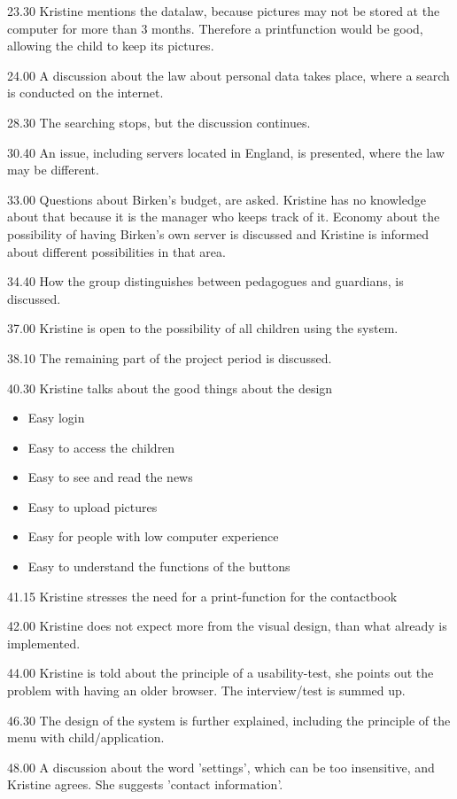 23.30
Kristine mentions the datalaw, because pictures may not be stored at the computer for more than 3 months. Therefore a printfunction would be good, allowing the child to keep its pictures.

24.00
A discussion about the law about personal data takes place, where a search is conducted on the internet.

28.30
The searching stops, but the discussion continues.

30.40
An issue, including servers located in England, is presented, where the law may be different.

33.00
Questions about Birken's budget, are asked. Kristine has no knowledge about that because it is the manager who keeps track of it. Economy about the possibility of having Birken's own server is discussed and Kristine is informed about different possibilities in that area.

34.40
How the group distinguishes between pedagogues and guardians, is discussed.

37.00
Kristine is open to the possibility of all children using the system.

38.10
The remaining part of the project period is discussed.

40.30
Kristine talks about the good things about the design
\begin{itemize}
\item{Easy login}
\item{Easy to access the children}
\item{Easy to see and read the news}
\item{Easy to upload pictures}
\item{Easy for people with low computer experience}
\item{Easy to understand the functions of the buttons}
\end{itemize}

41.15
Kristine stresses the need for a print-function for the contactbook

42.00
Kristine does not expect more from the visual design, than what already is implemented.

44.00
Kristine is told about the principle of a usability-test, she points out the problem with having an older browser.
The interview/test is summed up.

46.30
The design of the system is further explained, including the principle of the menu with child/application.

48.00
A discussion about the word 'settings', which can be too insensitive, and Kristine agrees. She suggests 'contact information'.

